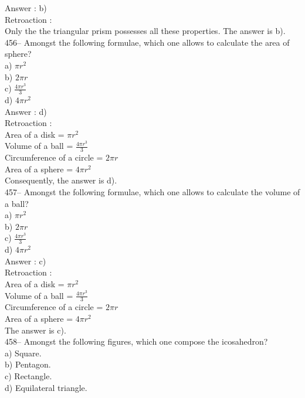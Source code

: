 ﻿\documentclass[letterpaper, 12pt]{article}
\begin{document}
Answer : b)\\

Retroaction :\\
Only the the triangular prism possesses all these properties. The answer is b).\\

456-- Amongst the following formulae, which one allows to calculate the area of sphere?\\
a) $\pi r^{2}$\\
b) $2\pi r$\\
c) $\frac{4\pi r^{3}}{3}$\\
d) $4\pi r^{2}$\\

Answer : d)\\

Retroaction : \\
Area of a disk =  $\pi r^{2}$\\[2mm]
Volume of a ball = $\frac{4\pi r^{3}}{3}$\\[2mm]
Circumference of a circle = $2\pi r$\\[2mm]
Area of a sphere = $4\pi r^{2}$\\[2mm]
Consequently, the answer is d).\\

457-- Amongst the following formulae, which one allows to calculate the volume of a ball?\\
a) $\pi r^{2}$\\
b) $2\pi r$\\
c) $\frac{4\pi r^{3}}{3}$\\
d) $4\pi r^{2}$\\

Answer : c)\\

Retroaction : \\
Area of a disk =  $\pi r^{2}$\\[2mm]
Volume of a ball = $\frac{4\pi r^{3}}{3}$\\[2mm]
Circumference of a circle = $2\pi r$\\[2mm]
Area of a sphere = $4\pi r^{2}$\\[2mm]
The answer is c).\\

458-- Amongst the following figures, which one compose the icosahedron?\\
a) Square.\\
b) Pentagon.\\
c) Rectangle.\\
d) Equilateral triangle.\\
\end{document}
